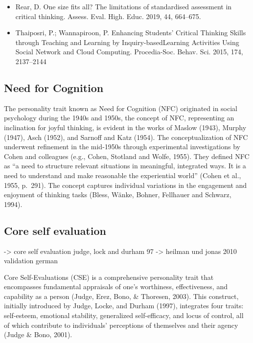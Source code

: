 \documentclass[
  12pt,
  a4paper,
  twoside]{article}
\begin{document}
\begin{itemize}
\item
  Rear, D. One size fits all? The limitations of standardised assessment in critical thinking. Assess. Eval. High. Educ. 2019, 44, 664--675.
\item
  Thaiposri, P.; Wannapiroon, P. Enhancing Students' Critical Thinking Skills through Teaching and Learning by Inquiry-basedLearning Activities Using Social Network and Cloud Computing. Procedia-Soc. Behav. Sci. 2015, 174, 2137--2144
\end{itemize}

\hypertarget{need-for-cognition}{%
\subsection{Need for Cognition}\label{need-for-cognition}}

The personality trait known as Need for Cognition (NFC) originated in social psychology during the 1940s and 1950s, the concept of NFC, representing an inclination for joyful thinking, is evident in the works of Maslow (1943), Murphy (1947), Asch (1952), and Sarnoff and Katz (1954). The conceptualization of NFC underwent refinement in the mid-1950s through experimental investigations by Cohen and colleagues (e.g., Cohen, Stotland and Wolfe, 1955). They defined NFC as ``a need to structure relevant situations in meaningful, integrated ways. It is a need to understand and make reasonable the experiential world'' (Cohen et al., 1955, p.~291). The concept captures individual variations in the engagement and enjoyment of thinking tasks (Bless, Wänke, Bohner, Fellhauer and Schwarz, 1994).

\hypertarget{core-self-evaluation}{%
\subsection{Core self evaluation}\label{core-self-evaluation}}

-\textgreater{} core self evaluation judge, lock and durham 97
-\textgreater{} heilman und jonas 2010 validation german

Core Self-Evaluations (CSE) is a comprehensive personality trait that encompasses fundamental appraisals of one's worthiness, effectiveness, and capability as a person (Judge, Erez, Bono, \& Thoresen, 2003). This construct, initially introduced by Judge, Locke, and Durham (1997), integrates four traits: self-esteem, emotional stability, generalized self-efficacy, and locus of control, all of which contribute to individuals' perceptions of themselves and their agency (Judge \& Bono, 2001).
\end{document}
